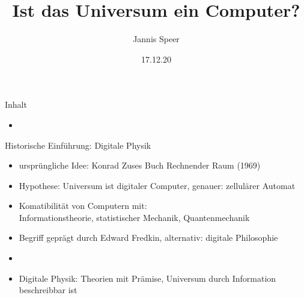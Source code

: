 \documentclass[aspectratio=1610, 9pt]{beamer}
\title{Ist das Universum ein Computer?}
\author[J.~Speer]{Jannis Speer}
\date{17.12.20}
\institute{Big Questions Seminar}
\begin{document}
\maketitle

\begin{frame}{Inhalt}
  \begin{itemize}
    \item
  \end{itemize}
\end{frame}


\begin{frame}{Historische Einführung: Digitale Physik}
  \begin{itemize}
    \item ursprüngliche Idee: Konrad Zuses Buch Rechnender Raum (1969)
    \item Hypothese: Universum ist digitaler Computer, genauer: zellulärer Automat
    \item Komatibilität von Computern mit: \\Informationstheorie, statistischer Mechanik, Quantenmechanik
    \item Begriff geprägt durch  Edward Fredkin, alternativ: digitale Philosophie
    \item[]
    \item[\rightarrow] Digitale Physik: Theorien mit Prämise, Universum durch Information beschreibbar ist
  \end{itemize}
\end{frame}
\end{document}
